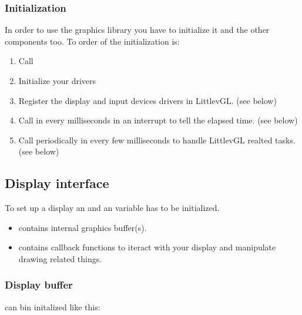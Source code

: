 \documentclass[letterpaper,10pt,english]{sphinxmanual}
\begin{document}
\subsubsection{Initialization}
\label{\detokenize{porting/project:initialization}}
In order to use the graphics library you have to initialize it and the other components too. To order of the initialization is:
\begin{enumerate}
\item {} 
Call 

\item {} 
Initialize your drivers

\item {} 
Register the display and input devices drivers in LittlevGL. (see below)

\item {} 
Call  in every  milliseconds in an interrupt to tell the elapsed time. (see below)

\item {} 
Call  periodically in every few milliseconds to handle LittlevGL realted tasks. (see below)

\end{enumerate}


\subsection{Display interface}
\label{\detokenize{porting/display::doc}}\label{\detokenize{porting/display:display-interface}}
To set up a display an  and an  variable has to be initialized.
\begin{itemize}
\item {} 
 contains internal graphics buffer(s).

\item {} 
 contains callback functions to iteract with your display and manipulate drawing related things.

\end{itemize}


\subsubsection{Display buffer}
\label{\detokenize{porting/display:display-buffer}}
 can bin initalized like this:
\end{document}
